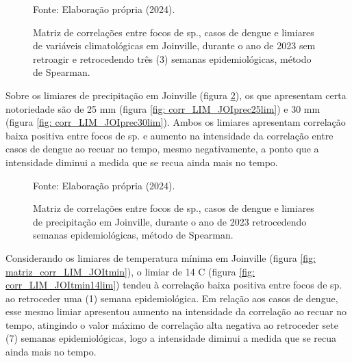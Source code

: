 \begin{figure}[htbp]
    \begin{center}
    \caption{Matriz de correlações entre focos de  sp., casos de dengue e limiares de variáveis climatológicas em Joinville, durante o ano de 2023 sem retroagir e retrocedendo três (3) semanas epidemiológicas, método de Spearman.}
    \label{fig: matriz_corr_LIM_JOIretro}
        \hfill
    \end{center}
    \small{Fonte: Elaboração própria (2024).}
\end{figure}

\indent Sobre os limiares de precipitação em Joinville (figura \ref{fig: matriz_corr_LIM_JOIprec}), os que apresentam certa notoriedade são de 25 mm (figura \ref{fig: corr_LIM_JOIprec25lim}) e 30 mm (figura \ref{fig: corr_LIM_JOIprec30lim}). Ambos os limiares apresentam correlação baixa positiva entre focos de  sp. e aumento na intensidade da correlação entre casos de dengue ao recuar no tempo, mesmo negativamente, a ponto que a intensidade diminui a medida que se recua ainda mais no tempo.

\begin{figure}[htbp]
    \begin{center}
    \caption{Matriz de correlações entre focos de  sp., casos de dengue e limiares de precipitação em Joinville, durante o ano de 2023 retrocedendo semanas epidemiológicas, método de Spearman.}
    \label{fig: matriz_corr_LIM_JOIprec}
        \hfill
    \end{center}
    \small{Fonte: Elaboração própria (2024).}
\end{figure}

\indent Considerando os limiares de temperatura mínima em Joinville (figura \ref{fig: matriz_corr_LIM_JOItmin}), o limiar de 14 C (figura \ref{fig: corr_LIM_JOItmin14lim}) tendeu à correlação baixa positiva entre focos de  sp. ao retroceder uma (1) semana epidemiológica. Em relação aos casos de dengue, esse mesmo limiar apresentou aumento na intensidade da correlação ao recuar no tempo, atingindo o valor máximo de correlação alta negativa ao retroceder sete (7) semanas epidemiológicas, logo a intensidade diminui a medida que se recua ainda mais no tempo.

